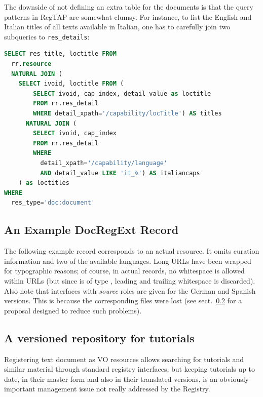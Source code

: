 \documentclass{ivoa}
\begin{document}
The downside of not defining an extra table for the documents is that
the query patterns in RegTAP are somewhat clumsy.  For instance, to list
the English and Italian titles of all texts available in Italian, one
has to carefully join two subqueries to \verb|res_details|:

\begin{lstlisting}[language=SQL]
SELECT res_title, loctitle FROM
  rr.resource 
  NATURAL JOIN (
    SELECT ivoid, loctitle FROM (
        SELECT ivoid, cap_index, detail_value as loctitle
        FROM rr.res_detail
        WHERE detail_xpath='/capability/locTitle') AS titles
      NATURAL JOIN (
        SELECT ivoid, cap_index 
        FROM rr.res_detail
        WHERE 
          detail_xpath='/capability/language'
          AND detail_value LIKE 'it_%') AS italiancaps
    ) as loctitles
WHERE
  res_type='doc:document'
\end{lstlisting}

\subsection{An Example DocRegExt Record}

The following example record corresponds to an actual resource.  It
omits curation information and two of the available languages.  Long
URLs have been wrapped for typographic reasons; of course, in actual
records, no whitespace is allowed within URLs (but since
 is of type , leading and trailing
whitespace is discarded).  Also note that interfaces with
\textit{source} roles
are given for the German and Spanish versions.  This is because the
corresponding files were lost (see sect.~\ref{sect:svn-repo} for a
proposal designed to reduce such problems).



\subsection{A versioned repository for tutorials}

\label{sect:svn-repo}

Registering text document as VO resources allows searching for tutorials
and similar 
material through standard registry interfaces, but keeping 
tutorials up to date, in their master form and also in their translated 
versions, is an obviously important management issue not really
addressed by the Registry.
\end{document}
